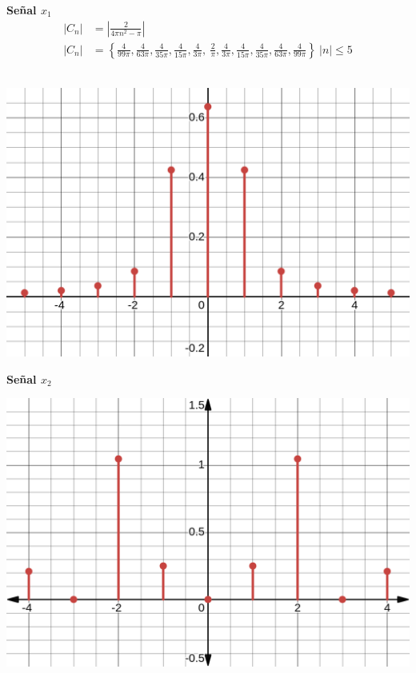 \documentclass[12pt,a4paper]{report}
\begin{document}
\begin{enumerate}[label=\alph*),left=0pt]
\begin{itemize}[left=0pt]

  \textbf{Señal $x_1$}\\
      $$
      \begin{aligned}
        |C_{n} |&=|\frac{2}{4\pi n^{2} -\pi } | \\
        |C_{n} |&=\left\{\frac{4}{99\pi } ,\frac{4}{63\pi } ,\frac{4}{35\pi } ,\frac{4}{15\pi } ,\frac{4}{3\pi } ,\ \frac{2}{\pi } ,\frac{4}{3\pi } ,\frac{4}{15\pi } ,\frac{4}{35\pi } ,\frac{4}{63\pi } ,\frac{4}{99\pi }\right\} \ |n|\leq 5
        \end{aligned}
        $$
\\

 \centering
  \begin{minipage}[h]{0.6\textwidth}
      \includegraphics[width=1\textwidth]{images/ej.2.3.png}
  \end{minipage}

     \textbf{Señal $x_2$}\\
  \begin{minipage}[h]{0.6\textwidth}
      \includegraphics[width=1\textwidth]{images/ej2.6.png}
  \end{minipage}




\end{itemize}
\end{enumerate}
\end{document}
